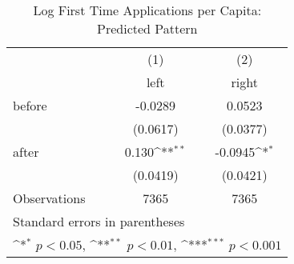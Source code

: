 \begin{table}[htbp]\centering
\def\sym#1{\ifmmode^{#1}\else\(^{#1}\)\fi}
\caption{Log First Time Applications per Capita: Predicted Pattern}
\begin{tabular}{l*{2}{c}}
\hline\hline
                    &\multicolumn{1}{c}{(1)}&\multicolumn{1}{c}{(2)}\\
                    &\multicolumn{1}{c}{left}&\multicolumn{1}{c}{right}\\
\hline
before              &     -0.0289         &      0.0523         \\
                    &    (0.0617)         &    (0.0377)         \\
[1em]
after               &       0.130\sym{**} &     -0.0945\sym{*}  \\
                    &    (0.0419)         &    (0.0421)         \\
\hline
Observations        &        7365         &        7365         \\
\hline\hline
\multicolumn{3}{l}{\footnotesize Standard errors in parentheses}\\
\multicolumn{3}{l}{\footnotesize \sym{*} \(p<0.05\), \sym{**} \(p<0.01\), \sym{***} \(p<0.001\)}\\
\end{tabular}
\end{table}
